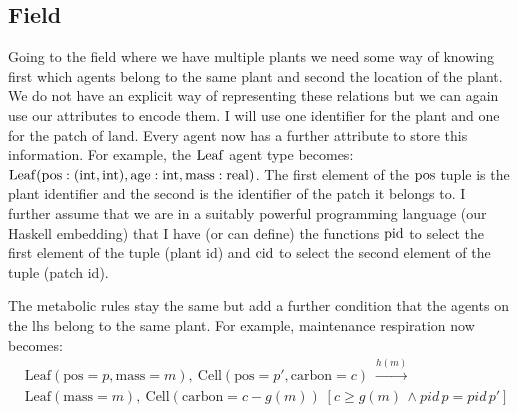 \subsection{Field}
Going to the field where we have multiple plants we need some way of knowing
first which agents belong to the same plant and second the location of the
plant. We do not have an explicit way of representing these relations but we can
again use our attributes to encode them. I will use one identifier for the plant
and one for the patch of land. Every agent now has a further attribute to store
this information. For example, the $\mathrm{Leaf}$ agent type becomes:
$\mathrm{Leaf}(\mathrm{pos}:(\mathrm{int}, \mathrm{int}), \mathrm{age}:\mathrm{int},
\mathrm{mass}:\mathrm{real})$. The first element of the $\mathrm{pos}$ tuple is the
plant identifier and the second is the identifier of the patch it belongs to. I
further assume that we are in a suitably powerful programming language (\eg our
Haskell embedding) that I have (or can define) the functions $\mathrm{pid}$ to
select the first element of the tuple (plant id) and $\mathrm{cid}$ to select the
second element of the tuple (patch id).

The metabolic rules stay the same but add a further condition that the
agents on the lhs belong to the same plant. For example, maintenance respiration
now becomes:
\begin{align*}
  &\mathrm{Leaf}(\mathrm{pos}=p, \mathrm{mass}=m),\:
    \mathrm{Cell}(\mathrm{pos}=p', \mathrm{carbon}=c) \:
    \xrightarrow{h(m)} \\ &\mathrm{Leaf}(\mathrm{mass}=m),\:
                            \mathrm{Cell}(\mathrm{carbon}=c-g(m)) \; [c \geq g(m)
                            \, \land pid \, p = pid \, p']
\end{align*}


